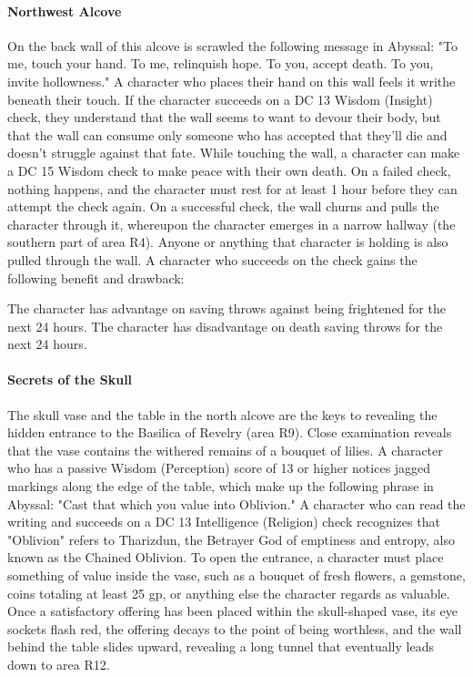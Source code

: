 \documentclass[10pt,a4,twoside,twocolumn,openany,nodeprecatedcode]{dndbook}
\begin{document}
\paragraph{Northwest Alcove}
On the back wall of this alcove is scrawled the following message in Abyssal: "To me, touch your hand. To me, relinquish hope. To you, accept death. To you, invite hollowness." A character who places their hand on this wall feels it writhe beneath their touch. If the character succeeds on a DC 13 Wisdom (Insight) check, they understand that the wall seems to want to devour their body, but that the wall can consume only someone who has accepted that they'll die and doesn't struggle against that fate.
While touching the wall, a character can make a DC 15 Wisdom check to make peace with their own death. On a failed check, nothing happens, and the character must rest for at least 1 hour before they can attempt the check again. On a successful check, the wall churns and pulls the character through it, whereupon the character emerges in a narrow hallway (the southern part of area R4). Anyone or anything that character is holding is also pulled through the wall.
A character who succeeds on the check gains the following benefit and drawback:
\begin{DndComment}{}
{{The character has advantage on saving throws against being frightened for the next 24 hours.}}
{{The character has disadvantage on death saving throws for the next 24 hours.}}
\end{DndComment}

\paragraph{Secrets of the Skull}
The skull vase and the table in the north alcove are the keys to revealing the hidden entrance to the Basilica of Revelry (area R9). Close examination reveals that the vase contains the withered remains of a bouquet of lilies.
A character who has a passive Wisdom (Perception) score of 13 or higher notices jagged markings along the edge of the table, which make up the following phrase in Abyssal: "Cast that which you value into Oblivion." A character who can read the writing and succeeds on a DC 13 Intelligence (Religion) check recognizes that "Oblivion" refers to Tharizdun, the Betrayer God of emptiness and entropy, also known as the Chained Oblivion.
To open the entrance, a character must place something of value inside the vase, such as a bouquet of fresh flowers, a gemstone, coins totaling at least 25 gp, or anything else the character regards as valuable. Once a satisfactory offering has been placed within the skull-shaped vase, its eye sockets flash red, the offering decays to the point of being worthless, and the wall behind the table slides upward, revealing a long tunnel that eventually leads down to area R12.
\end{document}
